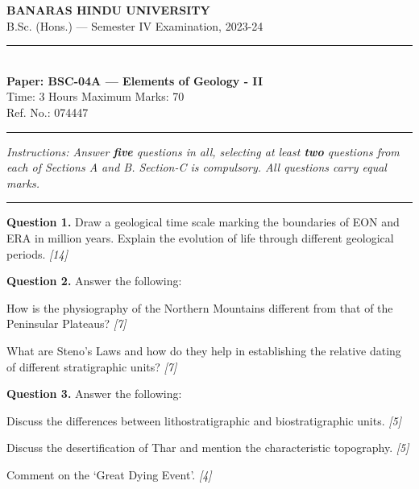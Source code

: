 \documentclass[11pt,a4paper]{article}
\newcommand{\pts}[1]{\hfill   \textit{[#1]}}
\begin{document}
\begin{center}
  {\large\bfseries BANARAS HINDU UNIVERSITY}\\[2pt]
  {\normalsize B.Sc. (Hons.) --- Semester IV Examination, 2023-24}\\[6pt]
  \rule{0.8\linewidth}{0.5pt}\\[6pt]
  {\large\bfseries Paper: BSC-04A --- Elements of Geology - II}\\[4pt]
  {\normalsize Time: 3 Hours \hfill Maximum Marks: 70}\\[2pt]
  {\small Ref. No.: 074447}
\end{center}
\rule{\linewidth}{0.4pt}
\smallskip



\noindent   \textit{Instructions: Answer   \textbf{five} questions in all, selecting at least   \textbf{two} questions from each of Sections A and B. Section-C is compulsory. All questions carry equal marks.}
\bigskip

\bigskip


\rule{\linewidth}{0.4pt}\smallskip




\noindent   \textbf{Question 1.} Draw a geological time scale marking the boundaries of EON and ERA in million years. Explain the evolution of life through different geological periods. \pts{14}

\medskip


\noindent   \textbf{Question 2.} Answer the following:

\begin{parts}
  \item How is the physiography of the Northern Mountains different from that of the Peninsular Plateaus? \pts{7}
  \item What are Steno's Laws and how do they help in establishing the relative dating of different stratigraphic units? \pts{7}
\end{parts}

\medskip


\noindent   \textbf{Question 3.} Answer the following:

\begin{parts}
  \item Discuss the differences between lithostratigraphic and biostratigraphic units. \pts{5}
  \item Discuss the desertification of Thar and mention the characteristic topography. \pts{5}
  \item Comment on the `Great Dying Event'. \pts{4}
\end{parts}
\end{document}
